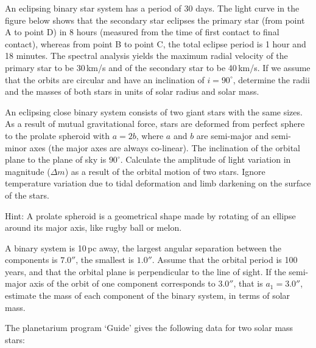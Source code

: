 An eclipsing binary star system has a period of 30 days. The light curve in
the figure below shows that the secondary star eclipses the primary star
(from point A to point D) in 8 hours (measured from the time of first contact
to final contact), whereas from point B to point C, the total eclipse period
is 1 hour and 18 minutes. The spectral analysis yields the maximum radial
velocity of the primary star to be 30\,km/s and of the secondary star to be
40\,km/s. If we assume that the orbits are circular and have an inclination
of $i = 90^\circ$, determine the radii and the masses of both stars in units
of solar radius and solar mass.

An eclipsing close binary system consists of two giant stars with the same
sizes. As a result of mutual gravitational force, stars are deformed from
perfect sphere to the prolate spheroid with $a = 2b$, where $a$ and $b$ are
semi-major and semi-minor axes (the major axes are always co-linear). The
inclination of the orbital plane to the plane of sky is $90^\circ$. Calculate
the amplitude of light variation in magnitude ($\Delta m$) as a result of the
orbital motion of two stars. Ignore temperature variation due to tidal
deformation and limb darkening on the surface of the stars.

Hint: A prolate spheroid is a geometrical shape made by rotating of an
ellipse around its major axis, like rugby ball or melon.

A binary system is 10\,pc away, the largest angular separation between the
components is $7.0''$, the smallest is $1.0''$. Assume that the orbital
period is 100 years, and that the orbital plane is perpendicular to the line
of sight. If the semi-major axis of the orbit of one component corresponds to
$3.0''$, that is $a_1 = 3.0''$, estimate the mass of each component of the
binary system, in terms of solar mass.

The planetarium program `Guide' gives the following data for two solar mass
stars:

